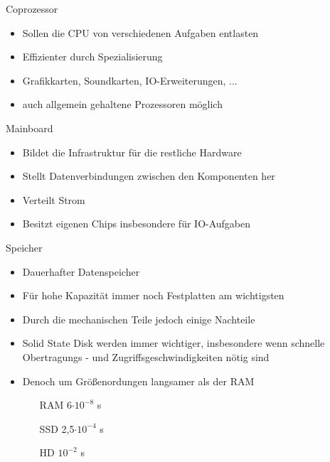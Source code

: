 \documentclass[aspectratio=43]{beamer}
\begin{document}
\begin{frame} 

	\begin{block}{Coprozessor} 
	\begin{itemize}
	\item Sollen die CPU von verschiedenen Aufgaben entlasten
	\item Effizienter durch Spezialisierung 
	\item Grafikkarten, Soundkarten, IO-Erweiterungen, ...
	\item auch allgemein gehaltene Prozessoren möglich
	\end{itemize}
	\end{block}

	\begin{block}{Mainboard} 
	\begin{itemize}
	\item Bildet die Infrastruktur für die restliche Hardware
	\item Stellt Datenverbindungen zwischen den Komponenten her
	\item Verteilt Strom
	\item Besitzt eigenen Chips insbesondere für IO-Aufgaben
	\end{itemize}
	\end{block}
\end{frame}

\begin{frame} 

	\begin{block}{Speicher} 
	\begin{itemize}
	\item Dauerhafter Datenspeicher
	\item Für hohe Kapazität immer noch Festplatten am wichtigsten
	\item Durch die mechanischen Teile jedoch einige Nachteile
	\item Solid State Disk werden immer wichtiger, insbesondere wenn schnelle Obertragungs - und Zugriffsgeschwindigkeiten nötig sind
	\item Denoch um Größenordungen langsamer als der RAM 
	\begin{itemize}
	 \item[RAM] 6$\cdot10^{-8}$ s
	\item[SSD] 2,5$\cdot10^{-4}$ s
	\item[HD] $10^{-2}$ s
	\end{itemize}

	
	\end{itemize}
	\end{block}

\end{frame}
\end{document}
